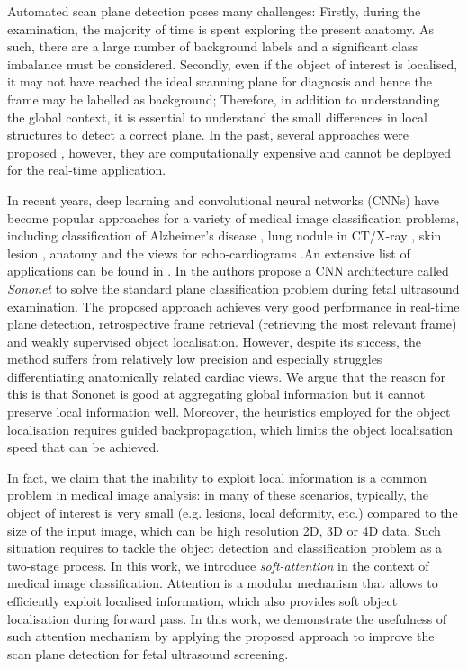 \documentclass{article}
\begin{document}
Automated scan plane detection poses many challenges: Firstly, during the examination, the majority of time is spent exploring the present anatomy. As such, there are a large number of background labels and a significant class imbalance must be considered. Secondly, even if the object of interest is localised, it may not have reached the ideal scanning plane for diagnosis and hence the frame may be labelled as background; Therefore, in addition to understanding the global context, it is essential to understand the small differences in local structures to detect a correct plane. In the past, several approaches were proposed \cite{yaqub2015guided, chen2015automatic}, however, they are computationally expensive and cannot be deployed for the real-time application.

In recent years, deep learning and convolutional neural networks (CNNs) have become popular approaches for a variety of medical image classification problems, including classification of Alzheimer's disease \cite{Sarraf070441}, lung nodule in CT/X-ray \cite{DBLP:journals/corr/abs-1801-09555}, skin lesion  \cite{esteva2017dermatologist, kawahara2016multi}, anatomy \cite{roth2015anatomy} and the views for echo-cardiograms \cite{madani2018fast}.An extensive list of applications can be found in \cite{DBLP:journals/corr/LitjensKBSCGLGS17,zaharchuk2018deep}. In \cite{baumgartner2016real} the authors propose a CNN architecture called \emph{Sononet} to solve the standard plane classification problem during fetal ultrasound examination. The proposed approach achieves very good performance in real-time plane detection, retrospective frame retrieval (retrieving the most relevant frame) and weakly supervised object localisation. However, despite its success, the method suffers from relatively low precision and especially struggles differentiating anatomically related cardiac views. We argue that the reason for this is that Sononet is good at aggregating global information but it cannot preserve local information well. Moreover, the heuristics employed for the object localisation requires guided backpropagation, which limits the object localisation speed that can be achieved.

In fact, we claim that the inability to exploit local information is a common problem in medical image analysis: in many of these scenarios, typically, the object of interest is very small (e.g. lesions, local deformity, etc.) compared to the size of the input image, which can be high resolution 2D, 3D or 4D data. Such situation requires to tackle the object detection and classification problem as a two-stage process. In this work, we introduce \emph{soft-attention} in the context of medical image classification. Attention is a modular mechanism that allows to efficiently exploit localised information, which also provides soft object localisation during forward pass. In this work, we demonstrate the usefulness of such attention mechanism by applying the proposed approach to improve the scan plane detection for fetal ultrasound screening.
\end{document}
